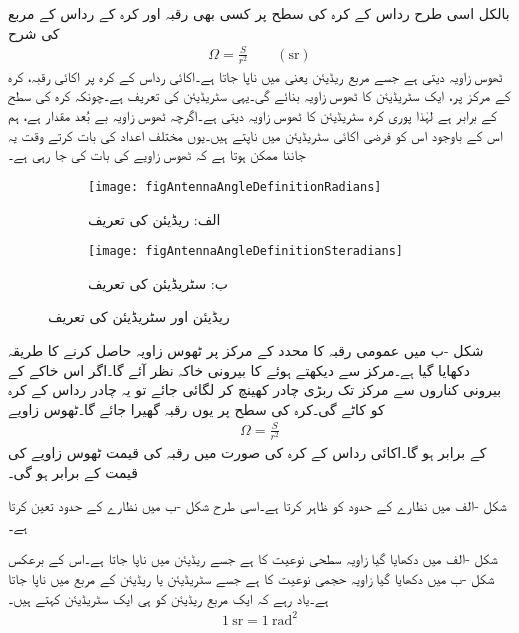 بالکل اسی طرح  رداس  کے کرہ کی سطح پر کسی بھی رقبہ  اور کرہ کے رداس کے مربع  کی شرح
\begin{align}\label{مساوات_اینٹینا_ٹھوس_زاویہ_تعریف}
\Omega=\frac{S}{r^2} \quad \quad (\si{\steradian})
\end{align}
ٹھوس زاویہ  دیتی ہے جسے مربع ریڈیئن یعنی   میں ناپا جاتا ہے۔اکائی رداس کے کرہ پر اکائی رقبہ، کرہ کے مرکز پر، ایک سٹریڈیئن  کا ٹھوس زاویہ بنائے گی۔یہی سٹریڈیئن کی تعریف ہے۔چونکہ کرہ کی سطح  کے برابر ہے لہٰذا پوری کرہ  سٹریڈیئن کا ٹھوس زاویہ دیتی ہے۔اگرچہ ٹھوس زاویہ بے بُعد مقدار ہے، ہم اس کے باوجود اس کو فرضی اکائی سٹریڈیئن میں ناپتے ہیں۔یوں مختلف اعداد کی بات کرتے وقت یہ جاننا ممکن ہوتا ہے کہ ٹھوس زاویے کی بات کی جا رہی ہے۔ 
\begin{figure}
\centering
\begin{subfigure}{0.5\textwidth}
\centering
\texttt{[image: figAntennaAngleDefinitionRadians]}
\caption*{الف: ریڈیئن کی تعریف}
\end{subfigure}%
%
\begin{subfigure}{0.5\textwidth}
\centering
\texttt{[image: figAntennaAngleDefinitionSteradians]}
\caption*{ب: سٹریڈیئن کی تعریف}
\end{subfigure}%
\caption{ریڈیئن اور سٹریڈیئن کی تعریف}
\label{شکل_اینٹینا_ریڈیئن_تعریف}
\end{figure}

شکل -ب میں عمومی رقبہ  کا محدد کے مرکز پر ٹھوس زاویہ حاصل کرنے کا طریقہ دکھایا گیا ہے۔مرکز سے دیکھتے ہوئے  کا بیرونی خاکہ نظر آئے گا۔اگر اس خاکے کے بیرونی کناروں سے  مرکز تک ربڑی چادر کھینچ کر لگائی جائے تو یہ چادر رداس  کے کرہ کو کاٹے گی۔کرہ کی سطح پر یوں رقبہ  گھیرا جائے گا۔ٹھوس زاویے
\begin{align}
\Omega=\frac{S}{r^2}
\end{align}
کے برابر ہو گا۔اکائی رداس کے کرہ کی صورت میں رقبہ  کی قیمت ٹھوس زاویے کی قیمت کے برابر ہو گی۔

شکل -الف میں   نظارے کے حدود کو ظاہر کرتا ہے۔اسی طرح شکل -ب میں  نظارے  کے حدود تعین کرتا ہے۔

شکل -الف  میں دکھایا گیا زاویہ سطحی نوعیت کا ہے جسے ریڈیئن میں ناپا جاتا ہے۔اس کے برعکس شکل -ب  میں دکھایا گیا زاویہ حجمی نوعیت کا ہے جسے سٹریڈیئن یا ریڈیئن کے مربع میں ناپا جاتا ہے۔یاد رہے کہ ایک مربع ریڈیئن کو ہی ایک سٹریڈیئن کہتے ہیں۔
\begin{align}
\SI{1}{\steradian}=\SI{1}{\radian \squared}
\end{align} 

